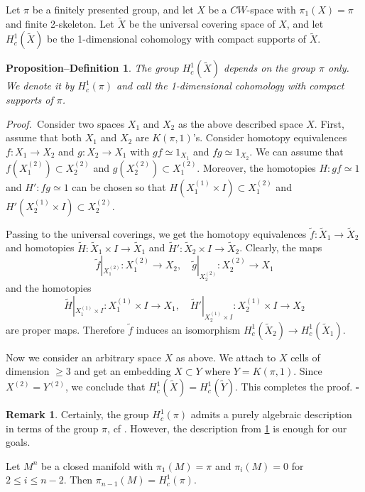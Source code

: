 \documentclass[12pt, twoside]{amsart}
\theoremstyle{plain}
\newtheorem{propdef}[theorem]{Proposition--Definition}
\theoremstyle{definition}
\newtheorem{remark}[theorem]{Remark}
\numberwithin{equation}{section}
\def\hqed{\hfill\hfill$\square$}
\def\m{\medskip}
\def\p{{\it Proof.\ }}
\def\wt #1{\widetilde #1}
\begin{document}
\m Let $\pi$ be a finitely presented group, and let $X$ be a $CW$-space with 
$\pi_1(X)=\pi$ and finite 2-skeleton. Let $\wt X$ be the universal covering 
space of $X$, and let $H^1_c(\wt X)$ be the 1-dimensional cohomology with 
compact supports of $\wt X$. 

\begin{propdef}\label{propdef}
The group $H^1_c(\wt X)$ depends on the group $\pi$ only. We denote it by 
$H^1_c(\pi)$ and call the 1-dimensional cohomology with compact supports of 
$\pi$. 
\end{propdef}

\p Consider two spaces $X_1$ and $X_2$ as the above described space $X$. 
First, 
assume that both $X_1$ and $X_2$ are $K(\pi,1)$'s. Consider homotopy 
equivalences $f: X_1 \to X_2$ and $g: X_2 \to X_1$ with $gf \simeq 1_{X_1}$ 
and 
$fg \simeq 1_{X_2}$. We can assume that $f(X_1^{(2)})\subset X_2^{(2)}$ and 
$g(X_2^{(2)})\subset X_1^{(2)}$. Moreover, the homotopies $H: gf\simeq 1$ and 
$H': fg \simeq 1$ can be chosen so that $H(X_1^{(1)} \times I) \subset 
X_1^{(2)}$ 
and $H'(X_2^{(1)} \times I) \subset X_2^{(2)}$. 

\m Passing to the universal coverings, we get the homotopy equivalences $\wt 
f: 
\wt X_1 \to \wt X_2$ and homotopies $\wt H: \wt X_1 \times I \to \wt X_1$ and 
$\wt H': \wt X_2 \times I \to \wt X_2$. Clearly, the maps 
$$
\wt f|_{X_1^{(2)}}: X_1^{(2)} \to X_2,\quad \wt g|_{X_2^{(2)} }:X_2^{(2)} \to 
X_1
$$
and the homotopies
$$
\wt H|_{X_1^{(1)} \times I}: {X_1^{(1)} \times I} \to X_1, \quad \wt 
H'|_{X_2^{(1)} \times I}: {X_2^{(1)} \times I} \to X_2
$$
are proper maps. Therefore $\wt f$ induces an isomorphism $H^1_c(\wt X_2) \to 
H^1_c(\wt X_1)$.

\m Now we consider an arbitrary space $X$ as above. We attach to $X$ cells of 
dimension $\ge 3$ and get an embedding $X \subset Y$ where $Y=K(\pi,1)$. Since 
$X^{(2)}=Y^{(2)}$, we conclude that $H^1_c(\wt X) = H^1_c(\wt Y)$. This 
completes the proof.
\hqed

\begin{remark}\rm
Certainly, the group  $H^1_c(\pi)$ admits a purely algebraic description in 
terms of the group $\pi$, cf \cite{R1, N}. However, the description from 
\ref{propdef} is enough for our goals.
\end{remark}

\begin{theorem}[\rm cf. \cite{R1}]
\label{pi}
Let $M^n$ be a closed manifold with $\pi_1(M) =\pi$ and $\pi_i(M)=0$ for $2\le 
i 
\le n-2$. Then $\pi_{n-1}(M)=H^1_c(\pi)$. 
\end{theorem}
\end{document}
